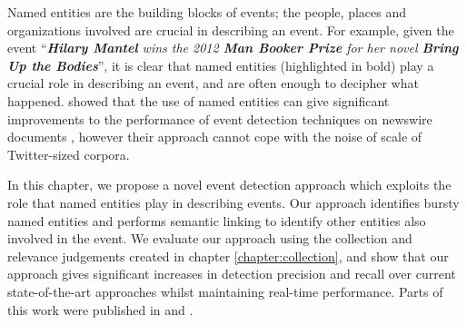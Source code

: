 
Named entities are the building blocks of events; the people, places and organizations involved are crucial in describing an event. For example, given the event ``\textit{\textbf{Hilary Mantel} wins the 2012 \textbf{Man Booker Prize} for her novel \textbf{Bring Up the Bodies}}'', it is clear that named entities (highlighted in bold) play a crucial role in describing an event, and are often enough to decipher what happened. \cite{Kumaran:2004:TCN:1008992.1009044, Kumaran2005} showed that the use of named entities can give significant improvements to the performance of event detection techniques on newswire documents \citep{Kumaran2005}, however their approach cannot cope with the noise of scale of Twitter-sized corpora.

In this chapter, we propose a novel event detection approach which exploits the role that named entities play in describing events. Our approach identifies bursty named entities and performs semantic linking to identify other entities also involved in the event. We evaluate our approach using the collection and relevance judgements created in chapter \ref{chapter:collection}, and show that our approach gives significant increases in detection precision and recall over current state-of-the-art approaches whilst maintaining real-time performance. Parts of this work were published in \cite{McMinn15} and \cite{McMinn14}.